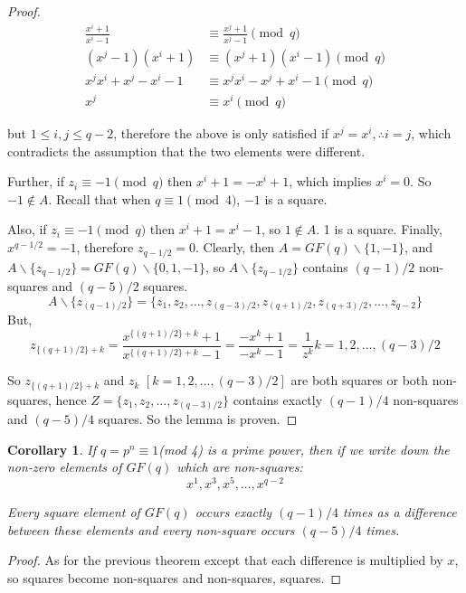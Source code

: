\documentclass[
  11pt,
  a4paper]{book}
\newtheorem{corollary}{Corollary}[theorem]
\begin{document}
\begin{proof}
\begin{align}
\frac{x^i + 1}{x^i - 1} &\equiv \frac{x^j + 1}{x^j - 1}\pmod q \\
(x^j-1)(x^i+1) &\equiv (x^j+1)(x^i-1)\pmod q \\
x^jx^i+x^j-x^i-1 &\equiv x^jx^i - x^j + x^i -1\pmod q \\
x^j &\equiv x^i\pmod q
\end{align}

but
$1 \leq i, j \leq q-2$, therefore the above is only
satisfied if $x^j = x^i, \therefore i = j$, which
contradicts the assumption that the two elements were
different.

Further, if $z_i \equiv -1\pmod q$
then $x^i + 1 = -x^i + 1$, which implies $x^i = 0$. So
$-1 \notin A$. Recall that when $q \equiv 1\pmod 4$, $-1$
is a square.

Also, if $z_i \equiv -1\pmod q$
then $x^i + 1 = x^i - 1$, so $1 \notin A$. 1 is a square.
Finally, $x^{q - 1/2} = -1$, therefore $z_{q - 1/2} = 0$.
Clearly, then $A = GF(q) \backslash \{1, -1\}$, and
$A \backslash \{z_{q - 1/2}\} = GF(q) \backslash \{0, 1, -1\}$,
so $A \backslash \{z_{q - 1/2}\}$ contains
$(q - 1)/2$ non-squares and $(q - 5)/2$ squares.
$$A \backslash \{z_{(q - 1)/2}\} = \{z_1, z_2, \ldots, z_{(q - 3)/2}, z_{(q  +1)/2}, z_{(q + 3)/2}, \ldots, z_{q - 2}\}$$
But,
$$z_{\{(q + 1)/2\} + k} = \frac{x^{\{(q + 1)/2\} + k} + 1}{x^{\{(q + 1)/2\} + k} - 1} = \frac{-x^k + 1}{-x^k - 1} = \frac{1}{z^k} k = 1, 2, \ldots, (q - 3)/2$$

So $z_{\{(q + 1)/2\} + k}$ and $z_k$ $[k = 1,2, \ldots, (q - 3)/2]$
are both squares or both non-squares, hence
$Z = \{z_1, z_2, \ldots, z_{(q - 3)/2}\}$
contains exactly $(q - 1)/4$ non-squares and $(q - 5)/4$
squares. So the lemma is proven.
\end{proof}

\begin{corollary}
If $q = p^n \equiv 1$(mod 4) is a prime power, then if we write down the
non-zero elements of $GF(q)$ which are non-squares:
$$x^1, x^3, x^5, \ldots, x^{q-2}$$

Every square element of $GF(q)$ occurs exactly $(q - 1)/4$
times as a difference between these elements and every
non-square occurs $(q - 5)/4$ times.
\end{corollary}

\begin{proof}
As for the previous theorem except that each difference is
multiplied by $x$, so squares become non-squares and
non-squares, squares.
\end{proof}
\end{document}
